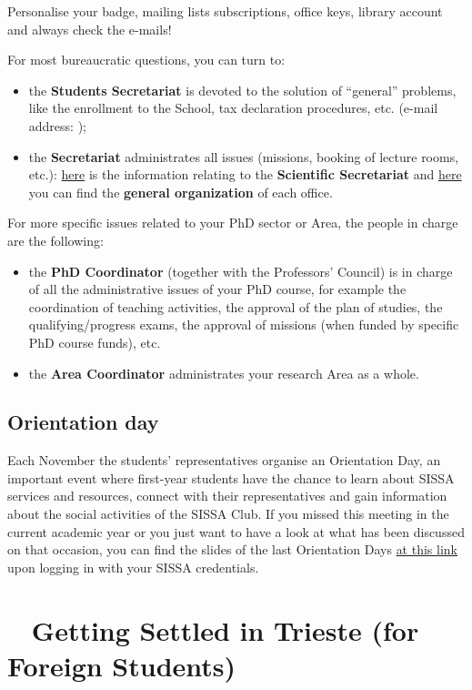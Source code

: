 \documentclass{sissavademecum}
\begin{document}
Personalise your badge, mailing lists subscriptions, office keys, library account and always check the e-mails!

\noindent For most bureaucratic questions, you can turn to:
\begin{itemize}
	\item the \textbf{Students Secretariat} is devoted to the solution of ``general'' problems, like the enrollment to the School, tax declaration procedures, etc. (e-mail address: );
	\item the \textbf{Secretariat} administrates all issues (missions, booking of lecture rooms, etc.): \href{https://www.sissa.it/scientific-secretariat}{here} is the information relating to the \textbf{Scientific Secretariat} and \href{https://www.sissa.it/articolazione-degli-uffici}{here} you can find the \textbf{general organization} of each office.
\end{itemize}
For more specific issues related to your PhD sector or Area, the people in charge are the following:
\begin{itemize}
	\item the \textbf{PhD Coordinator} (together with the Professors' Council) is in charge of all the administrative issues of your PhD course, for example the coordination of teaching activities, the approval of the plan of studies, the qualifying/progress exams, the approval of missions (when funded by specific PhD course funds), etc.
    \item the \textbf{Area Coordinator} administrates your research Area as a whole.
\end{itemize}


\section{Orientation day}

Each November the students' representatives organise an Orientation Day, an important event where first-year students have the chance to learn about SISSA services and resources, connect with their representatives and gain information about the social activities of the SISSA Club. If you missed this meeting in the current academic year or you just want to have a look at what has been discussed on that occasion, you can find the slides of the last Orientation Days \href{https://www.sissa.it/orientation-day}{at this link} upon logging in with your SISSA credentials.



\chapter{\texorpdfstring{\faHome\ }{} Getting Settled in Trieste (for Foreign Students)}
\end{document}
